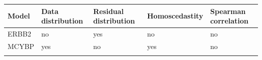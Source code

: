 \documentclass[]{article}
\begin{document}
\begin{longtable}[]{@{}lllll@{}}
\toprule
\begin{minipage}[b]{0.10\columnwidth}\raggedright
Model\strut
\end{minipage} & \begin{minipage}[b]{0.19\columnwidth}\raggedright
Data distribution\strut
\end{minipage} & \begin{minipage}[b]{0.21\columnwidth}\raggedright
Residual distribution\strut
\end{minipage} & \begin{minipage}[b]{0.16\columnwidth}\raggedright
Homoscedastity\strut
\end{minipage} & \begin{minipage}[b]{0.20\columnwidth}\raggedright
Spearman correlation\strut
\end{minipage}\tabularnewline
\midrule
\endhead
\begin{minipage}[t]{0.10\columnwidth}\raggedright
ERBB2\strut
\end{minipage} & \begin{minipage}[t]{0.19\columnwidth}\raggedright
no\strut
\end{minipage} & \begin{minipage}[t]{0.21\columnwidth}\raggedright
yes\strut
\end{minipage} & \begin{minipage}[t]{0.16\columnwidth}\raggedright
no\strut
\end{minipage} & \begin{minipage}[t]{0.20\columnwidth}\raggedright
no\strut
\end{minipage}\tabularnewline
\begin{minipage}[t]{0.10\columnwidth}\raggedright
MCYBP\strut
\end{minipage} & \begin{minipage}[t]{0.19\columnwidth}\raggedright
yes\strut
\end{minipage} & \begin{minipage}[t]{0.21\columnwidth}\raggedright
no\strut
\end{minipage} & \begin{minipage}[t]{0.16\columnwidth}\raggedright
yes\strut
\end{minipage} & \begin{minipage}[t]{0.20\columnwidth}\raggedright
no\strut
\end{minipage}\tabularnewline
\begin{minipage}[t]{0.10\columnwidth}\raggedright

\end{minipage}
\end{longtable}
\end{document}
